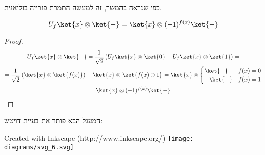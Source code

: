 \documentclass{tstextbook}
\begin{document}
\begin{remark}
כפי שנראה בהמשך, זה למעשה התמרת פורייה בוליאנית.

\end{remark}
\begin{lemma}
$$U_{f}\ket{x} \otimes \ket{-} =\ket{x} \otimes (-1)^{f(x)}\ket{-} $$

\end{lemma}
\begin{proof}
\begin{gather*}U_{f}\ket{x} \otimes \ket{-} =\frac{1}{\sqrt{ 2 }}\left( U_{f}\ket{x} \otimes \ket{0} -U_{f }\ket{x} \otimes \ket{1}  \right)= \\=\frac{1}{\sqrt{ 2 }}\left( \ket{x} \otimes \ket{f(x)}  \right)-\ket{x } \otimes \ket{f(x)\oplus 1} =\ket{x} \otimes \begin{cases}\ket{-}  & f(x)=0 \\-\ket{-} & f(x)=1 \end{cases}  \\\ket{x} \otimes (-1)^{f(x)}\ket{-} 
\end{gather*}

\end{proof}
\begin{proposition}
המעגל הבא פותר את בעיית דויטש:

 Created with Inkscape (http://www.inkscape.org/) \texttt{[image: diagrams/svg\_6.svg]}
\end{proposition}
\end{document}

